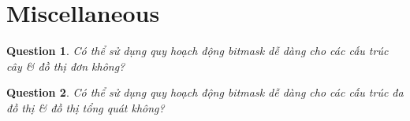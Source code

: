 \documentclass{article}
\newtheorem{question}{Question}
\begin{document}

\section{Miscellaneous}

\begin{question}
    Có thể sử dụng quy hoạch động bitmask dễ dàng cho các cấu trúc cây \& đồ thị đơn không?
\end{question}

\begin{question}
    Có thể sử dụng quy hoạch động bitmask dễ dàng cho các cấu trúc đa đồ thị \& đồ thị tổng quát không?
\end{question}


\printbibliography[heading=bibintoc]
\end{document}
